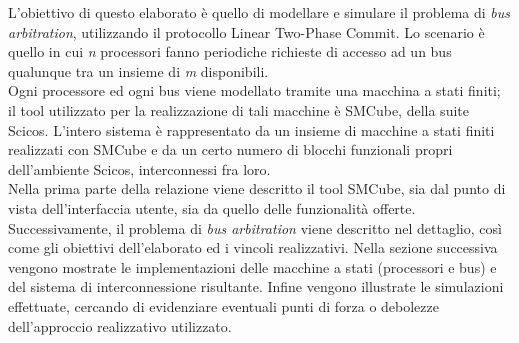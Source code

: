 L'obiettivo di questo elaborato è quello di modellare e simulare il problema di \textit{bus arbitration}, utilizzando il protocollo Linear Two-Phase Commit. Lo scenario è quello in cui \textit{n} processori fanno periodiche richieste di accesso ad un bus qualunque tra un insieme di \textit{m} disponibili.\\
Ogni processore ed ogni bus viene modellato tramite una macchina a stati finiti; il tool utilizzato per la realizzazione di tali macchine è SMCube, della suite Scicos. L'intero sistema è rappresentato da un insieme di macchine a stati finiti realizzati con SMCube e da un certo numero di blocchi funzionali propri dell'ambiente Scicos, interconnessi fra loro.\\
Nella prima parte della relazione viene descritto il tool SMCube, sia dal punto di vista dell'interfaccia utente, sia da quello delle funzionalità offerte. Successivamente, il problema di \textit{bus arbitration} viene descritto nel dettaglio, così come gli obiettivi dell'elaborato ed i vincoli realizzativi. Nella sezione successiva vengono mostrate le implementazioni delle macchine a stati (processori e bus) e del sistema di interconnessione risultante. Infine vengono illustrate le simulazioni effettuate, cercando di evidenziare eventuali punti di forza o debolezze dell'approccio realizzativo utilizzato.
